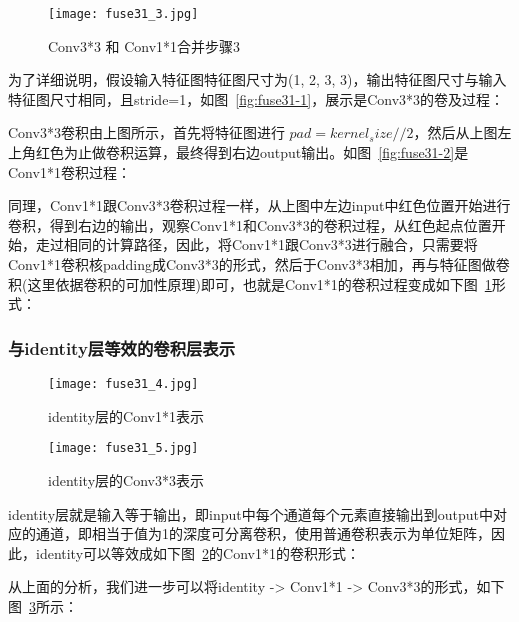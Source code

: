 \begin{figure}[]
    \centering
    \texttt{[image: fuse31\_3.jpg]}	%
    \caption{Conv3*3 和 Conv1*1合并步骤3}
    \label{fig:fuse31-3} %
\end{figure}

为了详细说明，假设输入特征图特征图尺寸为(1, 2, 3, 3)，输出特征图尺寸与输入特征图尺寸相同，且stride=1，如图~\ref{fig:fuse31-1}，展示是Conv3*3的卷及过程：

Conv3*3卷积由上图所示，首先将特征图进行 $pad=kernel_size//2$，然后从上图左上角红色为止做卷积运算，最终得到右边output输出。如图~\ref{fig:fuse31-2}是Conv1*1卷积过程：

同理，Conv1*1跟Conv3*3卷积过程一样，从上图中左边input中红色位置开始进行卷积，得到右边的输出，观察Conv1*1和Conv3*3的卷积过程，从红色起点位置开始，走过相同的计算路径，因此，将Conv1*1跟Conv3*3进行融合，只需要将Conv1*1卷积核padding成Conv3*3的形式，然后于Conv3*3相加，再与特征图做卷积(这里依据卷积的可加性原理)即可，也就是Conv1*1的卷积过程变成如下图~\ref{fig:fuse31-3}形式：


\subsubsection{与identity层等效的卷积层表示}

\begin{figure}[]
    \centering
    \texttt{[image: fuse31\_4.jpg]}	%
    \caption{identity层的Conv1*1表示}
    \label{fig:fuse31-4} %
\end{figure}

\begin{figure}[]
    \centering
    \texttt{[image: fuse31\_5.jpg]}	%
    \caption{identity层的Conv3*3表示}
    \label{fig:fuse31-5} %
\end{figure}

identity层就是输入等于输出，即input中每个通道每个元素直接输出到output中对应的通道，即相当于值为1的深度可分离卷积，使用普通卷积表示为单位矩阵，因此，identity可以等效成如下图~\ref{fig:fuse31-4}的Conv1*1的卷积形式：

从上面的分析，我们进一步可以将identity -> Conv1*1 -> Conv3*3的形式，如下图~\ref{fig:fuse31-5}所示：

